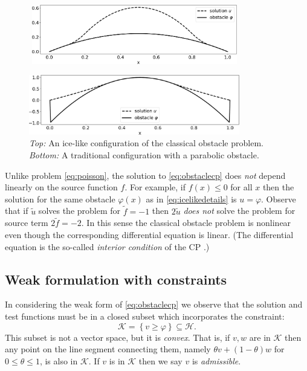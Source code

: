 \documentclass[letterpaper,final,12pt,reqno]{amsart}
\theoremstyle{claim}
\numberwithin{equation}{section}
\numberwithin{figure}{section}
\numberwithin{table}{section}
\numberwithin{theorem}{section}
\begin{document}
\begin{figure}
\,\,\includegraphics[width=0.8\textwidth]{fixfigs/icelike.pdf}

\bigskip\medskip
\includegraphics[width=0.82\textwidth]{fixfigs/parabola.pdf}

\medskip
\caption{\emph{Top:} An ice-like configuration of the classical obstacle problem. \emph{Bottom:} A traditional configuration with a parabolic obstacle.}
\label{fig:icelike}
\end{figure}

Unlike problem \eqref{eq:poisson}, the solution to \eqref{eq:obstaclecp} does \emph{not} depend linearly on the source function $f$.  For example, if $f(x)\le 0$ for all $x$ then the solution for the same obstacle $\varphi(x)$ as in \eqref{eq:icelikedetails} is $u=\varphi$.  Observe that if $\tilde u$ solves the problem for $\tilde f= -1$ then $2\tilde u$ \emph{does not} solve the problem for source term $2\tilde f = -2$.  In this sense the classical obstacle problem is nonlinear even though the corresponding differential equation is linear.  (The differential equation is the so-called \emph{interior condition} of the CP \cite{KinderlehrerStampacchia1980}.)

\subsection*{Weak formulation with constraints}  In considering the weak form of \eqref{eq:obstaclecp} we observe that the solution and test functions must be in a closed subset which incorporates the constraint:
\begin{equation}
\mathcal{K} = \left\{v \ge \varphi\right\} \subseteq \mathcal{H}.  \label{eq:Kdefine}
\end{equation}
This subset is not a vector space, but it is \emph{convex}.  That is, if $v,w$ are in $\mathcal{K}$ then any point on the line segment connecting them, namely $\theta v + (1-\theta) w$ for $0 \le \theta \le 1$, is also in $\mathcal{K}$.  If $v$ is in $\mathcal{K}$ then we say $v$ is \emph{admissible}.
\end{document}
